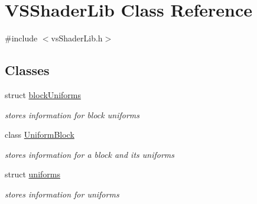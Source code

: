 \hypertarget{class_v_s_shader_lib}{}\section{V\+S\+Shader\+Lib Class Reference}
\label{class_v_s_shader_lib}


{\ttfamily \#include $<$vs\+Shader\+Lib.\+h$>$}

\subsection*{Classes}
\begin{DoxyCompactItemize}
\item 
struct \hyperlink{struct_v_s_shader_lib_1_1block_uniforms}{block\+Uniforms}
\begin{DoxyCompactList}\small\item\em stores information for block uniforms \end{DoxyCompactList}\item 
class \hyperlink{class_v_s_shader_lib_1_1_uniform_block}{Uniform\+Block}
\begin{DoxyCompactList}\small\item\em stores information for a block and its uniforms \end{DoxyCompactList}\item 
struct \hyperlink{struct_v_s_shader_lib_1_1uniforms}{uniforms}
\begin{DoxyCompactList}\small\item\em stores information for uniforms \end{DoxyCompactList}\end{DoxyCompactItemize}
